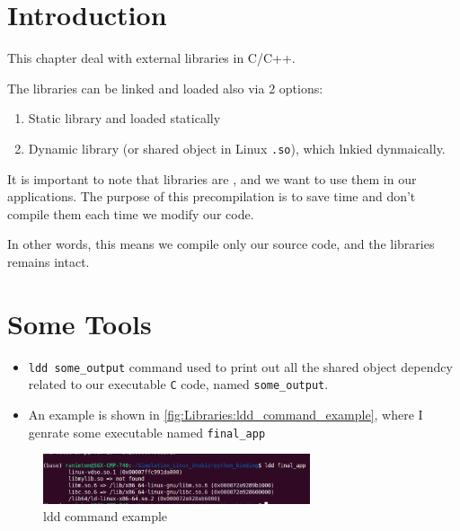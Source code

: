 \documentclass[12pt,a4paper]{book}
\begin{document}
\section{Introduction}

This chapter deal with external libraries in C/C++.


The libraries can be linked and loaded also via 2 options:

\begin{enumerate}

\item Static library and loaded statically

\item Dynamic library (or shared object in Linux \verb|.so|), which lnkied dynmaically.

\end{enumerate}


It is important to note that libraries are , and we want to use them in our applications. The purpose of this precompilation is to save time and don't compile them each time we modify our code.

In other words, this means we compile only our source code, and the libraries remains intact.

\section{Some Tools}

\begin{itemize}

\item \verb|ldd some_output| command used to print out all the shared object dependcy related to our executable \verb|C| code, named \verb|some_output|.


\item An example is shown in \autoref{fig:Libraries:ldd_command_example}, where I genrate some executable named \verb|final_app|

\end{itemize}

\begin{figure}[h]
\centering
\includegraphics[width = 0.7\textwidth, frame]{Figures/Libraries/ldd_command_example}
\caption{ldd command example}
\label{fig:Libraries:ldd_command_example}
\end{figure}
\end{document}
